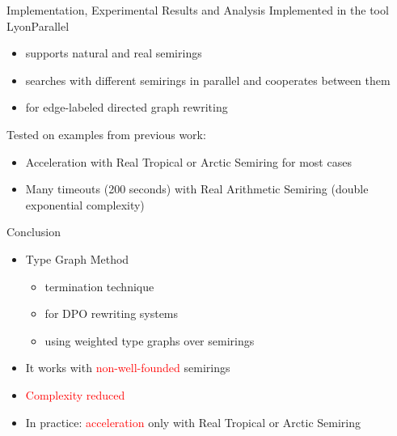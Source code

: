 \documentclass{beamer}
\begin{document}
\begin{frame}{Implementation, Experimental Results and Analysis}
  \alert{Implemented} in the tool LyonParallel
        \begin{itemize}
          \item supports natural and real semirings
          \item searches with different semirings in parallel and cooperates between them
          \item for edge-labeled directed graph rewriting
        \end{itemize}

  \alert{Tested} on examples from previous work:
  \begin{itemize}
    \item \alert{Acceleration} with \alert{Real Tropical} or \alert{Arctic Semiring} for most cases
    \item Many \alert{timeouts} (200 seconds) with \alert{Real Arithmetic Semiring} (double exponential complexity)
  \end{itemize}
\end{frame}

\begin{frame}{Conclusion}
  \begin{itemize}
    \item Type Graph Method 
         \begin{itemize}
          \item termination technique
          \item for DPO rewriting systems
          \item using weighted type graphs over semirings
         \end{itemize}
    \item It works with \textcolor{red}{non-well-founded} semirings
    \item \textcolor{red}{Complexity reduced}
    \item In practice: \textcolor{red}{acceleration} only with Real Tropical or Arctic Semiring
  \end{itemize}
\end{frame} 
\end{document}
